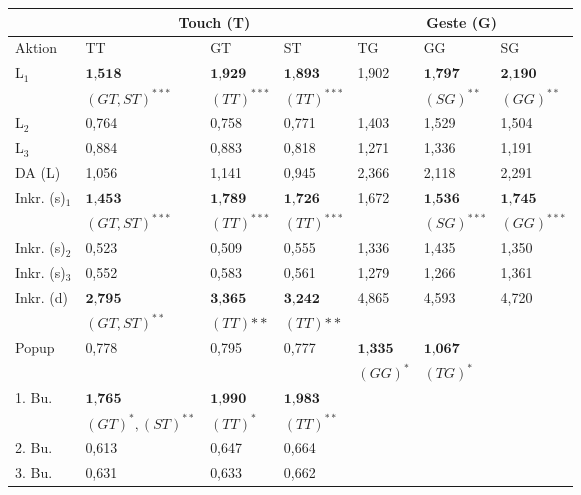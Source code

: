 \begin{table}[ht]
  \centering
	\begin{tabular}{|l|l|l|l|l|l|l|}
		\hline
		& 					\multicolumn{3}{|c|}{Touch (T)} & \multicolumn{3}{|c|}{Geste (G)}\\
		\hline
		Aktion 					& TT 	& GT 	& ST 	& TG 	& GG 	& SG 	\\
		\hline
		L$_1$				& $\textbf{1,518}$ 				& $\textbf{1,929}$				& $\textbf{1,893}$ 				&	1,902	&	$\textbf{1,797}$					&	$\textbf{2,190}$		\\
									& \small{$(GT, ST)^{***}$}	&	\small{$(TT)^{***}$}			& \small{$(TT)^{***}$}			&				&	\small{$(SG)^{**}$}				&	\small{$(GG)^{**}$}	\\
		\hline
		L$_2$			& 0,764 & 0,758	& 0,771 &	1,403	&	1,529	&	1,504 \\
		\hline
		L$_3$				& 0,884 & 0,883	& 0,818 &	1,271	&	1,336	&	1,191	\\
		\hline
		DA (L)				& 1,056 & 1,141	& 0,945 &	2,366	&	2,118	&	2,291	\\
		\hline
		Inkr. (s)$_1$				& $\textbf{1,453}$ 				& $\textbf{1,789}$		& $\textbf{1,726}$ 			&	1,672	&	$\textbf{1,536}$			&	$\textbf{1,745}$\\
									& \small{$(GT,ST)^{***}$} 	& \small{$(TT)^{***}$}	& \small{$(TT)^{***}$} 	&				&	\small{$(SG)^{***}$}		&	\small{$(GG)^{***}$}\\
		\hline
		Inkr. (s)$_2$				& 0,523 & 0,509	& 0,555 &	1,336	&	1,435	&	1,350\\
		\hline
		Inkr. (s)$_3$				& 0,552 & 0,583	& 0,561 &	1,279	&	1,266	&	1,361\\
		\hline
		Inkr. (d) 				& $\textbf{2,795}$ & $\textbf{3,365}$	& $\textbf{3,242}$ &	4,865	&	4,593	&	4,720\\
									& \small{$(GT,ST)^{**}$} & \small{$(TT){**}$}	& \small{$(TT){**}$}  &	&	&	\\
		\hline
		Popup 				& 0,778 & 0,795	& 0,777 &	$\textbf{1,335}$		&	$\textbf{1,067}$ &\\
									& 			& 			&  			&	\small{$(GG)^{*}$}	&	\small{$(TG)^{*}$} &		\\
		\hline
		1. Bu.  		& $\textbf{1,765}$ 						& $\textbf{1,990}$		& $\textbf{1,983}$ 	&				& 			&   \\
									& \small{$(GT)^{*},(ST)^{**}$}	& \small{$(TT)^{*}$}		& \small{$(TT)^{**}$}&			& 		& 	\\
		\hline
		2. Bu.  		& 0,613 & 0,647	& 0,664 &			& 			& 	 \\
		\hline
		3. Bu.  		& 0,631 & 0,633	& 0,662 &				& 			& \\

\end{tabular}
\end{table}
